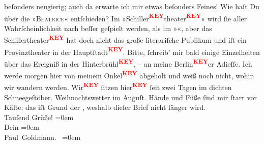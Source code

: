 \begin{ledgroupsized}[t]{13cm}
                    beſonders neugierig; auch da erwarte ich mir etwas  beſonders Feines! Wie haſt Du über die »\textsc{Beatrice}« entſchieden? Im »Schiller\textcolor{red}{\textsuperscript{\textbf{KEY}}}theater\textcolor{red}{\textsuperscript{\textbf{KEY}}}« wird ſie aller Wahrſcheinlichkeit nach
                    beſſer geſpielt werden, als im »\label{XXXXv}\label{XXXX}«, aber das Schillertheater\textcolor{red}{\textsuperscript{\textbf{KEY}}} hat doch nicht das große literariſche Publikum und iſt
                    ein Provinztheater in der \strikeout{\textcolor{gray}{H}}Hauptſtadt\textcolor{red}{\textsuperscript{\textbf{KEY}}}. Bitte, ſchreib’ mir bald {\pb} einige Einzelheiten über das Ereigniß in der
                        Hinterbrühl\textcolor{red}{\textsuperscript{\textbf{KEY}}}, – an meine Berlin\textcolor{red}{\textsuperscript{\textbf{KEY}}}er Adieſſe. Ich werde morgen hier von meinem Onkel\textcolor{red}{\textsuperscript{\textbf{KEY}}} abgeholt und weiß noch nicht, wohin wir
                    wandern werden. Wir\textcolor{red}{\textsuperscript{\textbf{KEY}}} ſitzen hier\textcolor{red}{\textsuperscript{\textbf{KEY}}} ſeit zwei Tagen im dichten Schneegeſtöber. Weihnachtswetter im
                        Auguſt. Hände und Füße ſind mir ſtarr vor Kälte; das iſt
                        Grund der , weshalb  dieſer Brief nicht länger wird. {\pb}{\\[\baselineskip]}Tauſend Grüße!\pend
           \leftskip=0em{}\pstart
           {\\[\baselineskip]}Dein\pend
           \leftskip=0em{}\pstart
           {\\[\baselineskip]}\spacefill\mbox{Paul Goldmann. }\pend
           \leftskip=0em{}
         
         \endnumbering{}\end{ledgroupsized}\begin{anhang}\end{anhang}\newcommand{\dateiname}{L03219}\newcommand{\titel}{Paul Goldmann an Arthur Schnitzler, 12. 8. [1902]}\newcommand{\editorInnen}{Martin Anton Müller und Laura Untner}
      